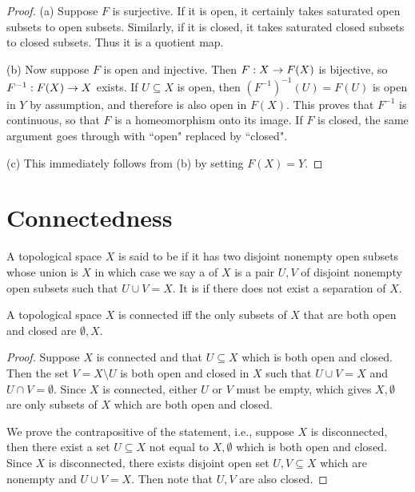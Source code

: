 \documentclass[11pt,a4paper]{article}
\begin{document}
\begin{proof}
(a) Suppose $F$ is surjective. If it is open, it certainly takes saturated open subsets to open subsets. Similarly, if it is closed, it takes saturated closed subsets to closed subsets. Thus it is a quotient map.

\noindent(b) Now suppose $F$ is open and injective. Then $F:X\rightarrow F(X)$ is bijective, so $F^{-1}:F(X)\rightarrow X$ exists. If $U\subseteq X$ is open, then $(F^{-1})^{-1}(U) = F(U)$ is open in $Y$ by assumption, and therefore is also open in $F(X)$. This proves that $F^{-1}$ is continuous, so that $F$ is a homeomorphism onto its image. If $F$ is closed, the same argument goes through with ``open" replaced by ``closed". 

\noindent(c) This immediately follows from (b) by setting $F(X) = Y$.
\end{proof}

\section{Connectedness}

\begin{definition}
A topological space $X$ is said to be  if it has two disjoint nonempty open subsets whose union is $X$ in which case we say a  of $X$ is a pair $U, V$ of disjoint nonempty open subsets such that $U\cup V = X$. It is  if there does not exist a separation of $X$.
\end{definition}

\begin{proposition}
A topological space $X$ is connected iff the only subsets of $X$ that are both open and closed are $\emptyset, X$.
\end{proposition}

\begin{proof}
\forward Suppose $X$ is connected and that $U\subseteq X$ which is both open and closed. Then the set $V = X\setminus U$ is both open and closed in $X$ such that $U\cup V = X$ and $U\cap V = \emptyset$. Since $X$ is connected, either $U$ or $V$ must be empty, which gives $X,\emptyset$ are only subsets of $X$ which are both open and closed.

\noindent\converse We prove the contrapositive of the statement, i.e., suppose $X$ is disconnected, then there exist a set $U\subseteq X$ not equal to $X,\emptyset$ which is both open and closed. Since $X$ is disconnected, there exists disjoint open set $U, V\subseteq X$ which are nonempty and $U\cup V = X$. Then note that $U, V$ are also closed.
\end{proof}
\end{document}
